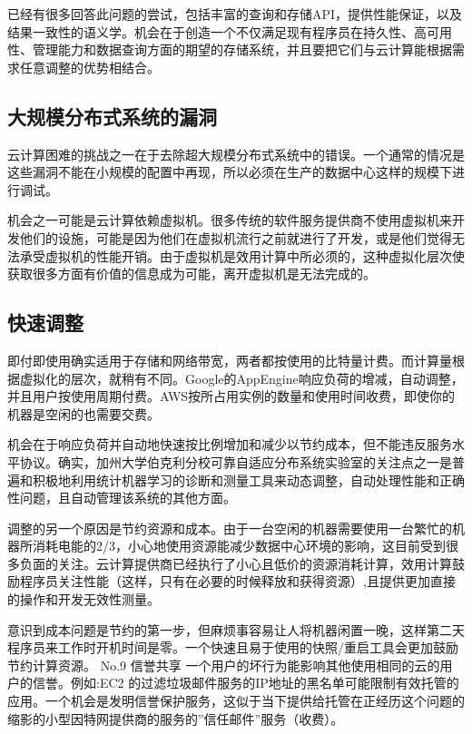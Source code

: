 已经有很多回答此问题的尝试，包括丰富的查询和存储API，提供性能保证，以及结果一致性的语义学。机会在于创造一个不仅满足现有程序员在持久性、高可用性、管理能力和数据查询方面的期望的存储系统，并且要把它们与云计算能根据需求任意调整的优势相结合。

\subsection{大规模分布式系统的漏洞}

云计算困难的挑战之一在于去除超大规模分布式系统中的错误。一个通常的情况是这些漏洞不能在小规模的配置中再现，所以必须在生产的数据中心这样的规模下进行调试。

机会之一可能是云计算依赖虚拟机。很多传统的软件服务提供商不使用虚拟机来开发他们的设施，可能是因为他们在虚拟机流行之前就进行了开发，或是他们觉得无法承受虚拟机的性能开销。由于虚拟机是效用计算中所必须的，这种虚拟化层次使获取很多方面有价值的信息成为可能，离开虚拟机是无法完成的。

\subsection{快速调整}

即付即使用确实适用于存储和网络带宽，两者都按使用的比特量计费。而计算量根据虚拟化的层次，就稍有不同。Google的AppEngine响应负荷的增减，自动调整，并且用户按使用周期付费。AWS按所占用实例的数量和使用时间收费，即使你的机器是空闲的也需要交费。

机会在于响应负荷并自动地快速按比例增加和减少以节约成本，但不能违反服务水平协议。确实，加州大学伯克利分校可靠自适应分布系统实验室的关注点之一是普遍和积极地利用统计机器学习的诊断和测量工具来动态调整，自动处理性能和正确性问题，且自动管理该系统的其他方面。

调整的另一个原因是节约资源和成本。由于一台空闲的机器需要使用一台繁忙的机器所消耗电能的2/3，小心地使用资源能减少数据中心环境的影响，这目前受到很多负面的关注。云计算提供商已经执行了小心且低价的资源消耗计算，效用计算鼓励程序员关注性能（这样，只有在必要的时候释放和获得资源）,且提供更加直接的操作和开发无效性测量。

意识到成本问题是节约的第一步，但麻烦事容易让人将机器闲置一晚，这样第二天程序员来工作时开机时间是零。一个快速且易于使用的快照/重启工具会更加鼓励节约计算资源。
No.9 信誉共享
一个用户的坏行为能影响其他使用相同的云的用户的信誉。例如:EC2 的过滤垃圾邮件服务的IP地址的黑名单可能限制有效托管的应用。一个机会是发明信誉保护服务，这似于当下提供给托管在正经历这个问题的缩影的小型因特网提供商的服务的”信任邮件”服务（收费）。


